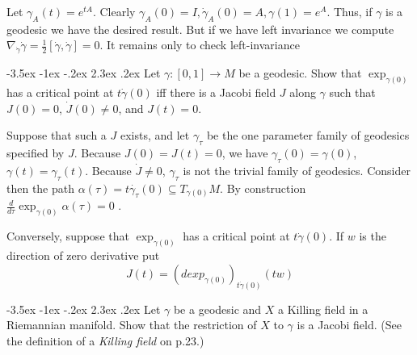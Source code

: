 \documentclass[10pt]{article}
\makeatletter
\renewcommand\section{\@startsection{section}{1}{\z@}%
                                  {-3.5ex \@plus -1ex \@minus -.2ex}%
                                  {2.3ex \@plus.2ex}%
                                  {\normalfont\large\bfseries}}
\DeclareMathOperator{\2}{II}
\makeatother
\begin{document}
Let $\gamma_A(t) = e^{tA}$. Clearly $\gamma_A(0) = I, \dot{\gamma}_A(0) = A, \gamma(1) = e^A$. Thus, if $\gamma$ is a geodesic we have the desired result. But if we have left invariance we compute $\nabla_{\dot{\gamma}}  \dot{\gamma} = \frac{1}{2}[\dot{\gamma}, \dot{\gamma}] =0.$ It remains only to check left-invariance 



\section{Let $\gamma :[0,1] \to M$ be a geodesic. Show that $\exp_{\gamma(0)}$ has a critical point at $t \dot{\gamma}(0)$ iff there is a Jacobi field $J$ along $\gamma$ such that $J(0) = 0$, $\dot{J}(0) \neq 0$, and $J(t) =0$.}

Suppose that such a $J$ exists, and let $\gamma_\tau$ be the one parameter family of geodesics specified by $J$. Because $J(0)= J(t) = 0$, we have $\gamma_\tau (0) = \gamma(0)$, $\gamma(t) = \gamma_\tau(t)$. Because $\dot{J} \neq 0$, $\gamma_\tau$ is not the trivial family of geodesics. Consider then  the path $\alpha(\tau)  = t \dot{\gamma_\tau}(0) \subseteq T_{\gamma(0)}M$. By construction $ \frac{d}{d \tau} \exp_{\gamma(0)} \alpha(\tau) =0$ .

Conversely, suppose that $\exp_{\gamma(0)}$ has a critical point at $t \dot{\gamma}(0)$. If $w$ is the direction of zero derivative put
\[J(t) = ( d exp_{\gamma(0)})_{t \dot{\gamma}(0)}(tw)\]

\section{Let $\gamma$ be a geodesic and $X$ a Killing field in a Riemannian manifold. Show that the restriction of $X$ to $\gamma$ is a Jacobi field. (See the definition of a \emph{Killing field} on p.23.)}
\end{document}
